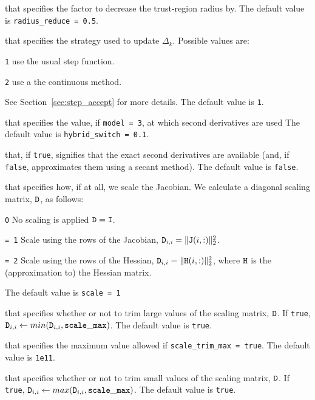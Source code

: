 \begin{description}
that specifies the factor to decrease the trust-region radius by.
The default value is {\tt radius\_reduce = 0.5}.

that specifies the strategy used to update $\Delta_k$.  Possible values are:
\begin{description}
\item {\tt 1} use the usual step function.
\item {\tt 2} use a the continuous method.
\end{description}
See Section~\ref{sec:step_accept} for more details.
The default value is {\tt 1}.

that specifies the value, if {\tt model = 3}, at which second derivatives are used
The default value is {\tt hybrid\_switch = 0.1}.

that, if {\tt true}, signifies that the exact second derivatives are available (and, if {\tt false}, approximates them using a secant method).
The default value is {\tt false}.

that specifies how, if at all, we scale the Jacobian.  We calculate a diagonal scaling matrix, ${\tt D}$, as follows: 
\begin{description}
\item{\tt 0} No scaling is applied ${\tt D} ={\tt I}$.
\item{\tt = 1} Scale using the rows of the Jacobian, \({\tt D}_{i,i} = \|{\tt J}(i,:)\|_2^2\).
\item{\tt = 2} Scale using the rows of the Hessian,  \({\tt D}_{i,i} = \|{\tt H}(i,:)\|_2^2\), where ${\tt H}$ is the (approximation to) the Hessian matrix.
\end{description}
The default value is {\tt scale = 1}

that specifies whether or not to trim large values of the scaling matrix, ${\tt D}$.
If {\tt true}, ${\tt D}_{i,i} \leftarrow min({\tt D}_{i,i}, {\tt scale\_max})$.
The default value is {\tt true}.

that specifies the maximum value allowed if {\tt scale\_trim\_max = true}.
The default value is {\tt 1e11}.

that specifies whether or not to trim small values of the scaling matrix, ${\tt D}$.
If {\tt true}, ${\tt D}_{i,i} \leftarrow max({\tt D}_{i,i}, {\tt scale\_max})$.
The default value is {\tt true}.


\end{description}
